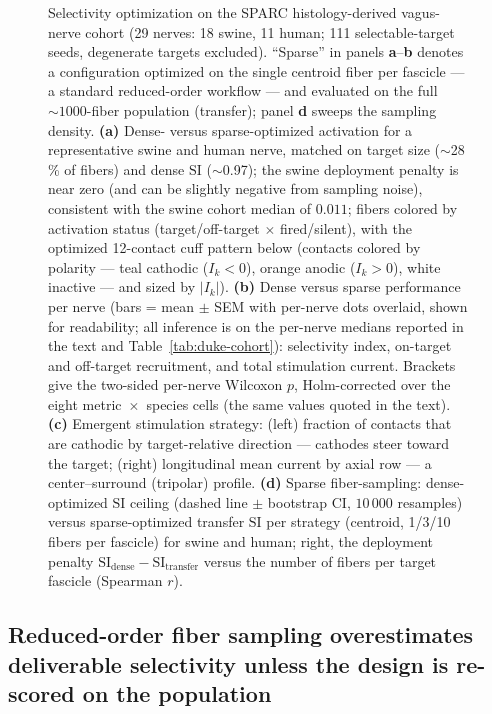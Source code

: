 \begin{figure}[h]
  \centering
  \caption{Selectivity optimization on the SPARC histology-derived
    vagus-nerve cohort (29 nerves: 18 swine, 11 human; 111
    selectable-target seeds, degenerate targets excluded).  ``Sparse''
    in panels \textbf{a}--\textbf{b} denotes a
    configuration optimized on the single centroid fiber per fascicle ---
    a standard reduced-order workflow --- and evaluated on the full
    ${\sim}1000$-fiber population (transfer); panel \textbf{d} sweeps the
    sampling density.
    \textbf{(a)} Dense- versus sparse-optimized activation for a
    representative swine and human nerve, matched on target size
    ($\sim$28\,\% of fibers) and dense $\mathrm{SI}$ ($\sim$0.97); the
    swine deployment penalty is near zero (and can be slightly negative
    from sampling noise), consistent with the swine cohort median of
    $0.011$;
    fibers colored by activation status (target/off-target $\times$
    fired/silent), with the optimized 12-contact cuff pattern below
    (contacts colored by polarity --- teal cathodic ($I_k<0$), orange
    anodic ($I_k>0$), white inactive --- and sized by $|I_k|$).
    \textbf{(b)} Dense versus sparse performance per nerve (bars = mean
    $\pm$ SEM with per-nerve dots overlaid, shown for readability;
    all inference is on the per-nerve medians reported in the text and
    Table~\ref{tab:duke-cohort}): selectivity index, on-target and
    off-target recruitment, and total stimulation current.  Brackets
    give the two-sided per-nerve Wilcoxon $p$, Holm-corrected over the
    eight metric~$\times$~species cells (the same values quoted in the
    text).
    \textbf{(c)} Emergent stimulation strategy: (left) fraction of
    contacts that are cathodic by target-relative direction ---
    cathodes steer toward the target; (right) longitudinal mean
    current by axial row --- a center--surround (tripolar) profile.
    \textbf{(d)} Sparse fiber-sampling: dense-optimized $\mathrm{SI}$
    ceiling (dashed line $\pm$ bootstrap CI, $10\,000$ resamples) versus sparse-optimized
    transfer $\mathrm{SI}$ per strategy (centroid, 1/3/10 fibers per
    fascicle) for swine and human; right, the deployment penalty
    $\mathrm{SI_{dense}} - \mathrm{SI_{transfer}}$ versus the number of
    fibers per target fascicle (Spearman $r$).}
  \label{fig:duke}
\end{figure}

\subsection{Reduced-order fiber sampling overestimates deliverable
  selectivity unless the design is re-scored on the population}
\label{sec:results-sparse}

